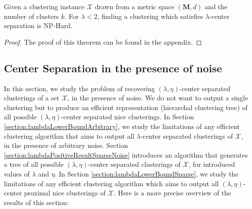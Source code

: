 \documentclass[anon,12pt]{colt2016} %
\newcommand{\mc}{\mathcal}
\newcommand{\mb}{\mathbf}
\begin{document}
\begin{theorem}
\label{thm:lambdaNoNoiseLowerBd}
Given a clustering instance $\mc X$ drawn from a metric space $(\mb M, d)$ and the number of clusters $k$. For $\lambda < 2$, finding a clustering which satisfies $\lambda$-center separation is NP-Hard.
\end{theorem}

\begin{proof}
The proof of this theorem can be found in the appendix.
\end{proof}


\subsection{Center Separation in the presence of noise}
\label{sec:cswith}
In this section, we study the problem of recovering $(\lambda, \eta)$-center separated clusterings of a set $\mc X$, in the presence of noise. We do not want to output a single clustering but to produce an efficient representation (hierarchal clustering tree) of all possible $(\lambda, \eta)$-center separated nice clusterings. In Section \ref{section:lambdaLowerBoundArbitrary}, we study the limitations of any efficient clustering algorithm that aims to output all $\lambda$-center separated clusterings of $\mc X$, in the presence of arbitrary noise. Section \ref{section:lambdaPositiveResultSparseNoise} introduces an algorithm that generates a tree of all possible $(\lambda,\eta)$-center separated clusterings of $\mc X$, for introduced values of $\lambda$ and $\eta$. In Section \ref{section:lambdaLowerBoundSparse}, we study the limitations of any efficient clustering algorithm which aims to output all $(\lambda,\eta)$-center proximal nice clusterings of $\mc X$. Here is a more precise overview of the results of this section:
\end{document}

